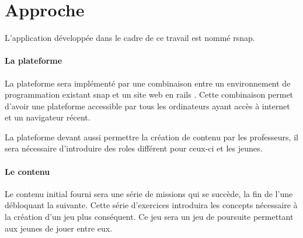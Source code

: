 \section{Approche}
\label{intro-approche}
L'application développée dans le cadre de ce travail est nommé \gls{rsnap}.

\paragraph{La plateforme} La plateforme sera implémenté par une combinaison entre un environnement de programmation existant \gls{snap} \cite{snap} et un site web en \gls{rails} \cite{rails}. Cette combinaison permet d'avoir une plateforme accessible par tous les ordinateurs ayant accès à internet et un navigateur récent.

La plateforme devant aussi permettre la création de contenu par les professeurs, il sera nécessaire d'introduire des \glspl{role} différent pour ceux-ci et les jeunes.

\paragraph{Le contenu} Le contenu initial fourni sera une série de \glspl{mission} qui se succède, la fin de l'une débloquant la suivante. Cette série d'exercices introduira les concepts nécessaire à la création d'un jeu plus conséquent. Ce jeu sera un jeu de poursuite permettant aux jeunes de jouer entre eux.
